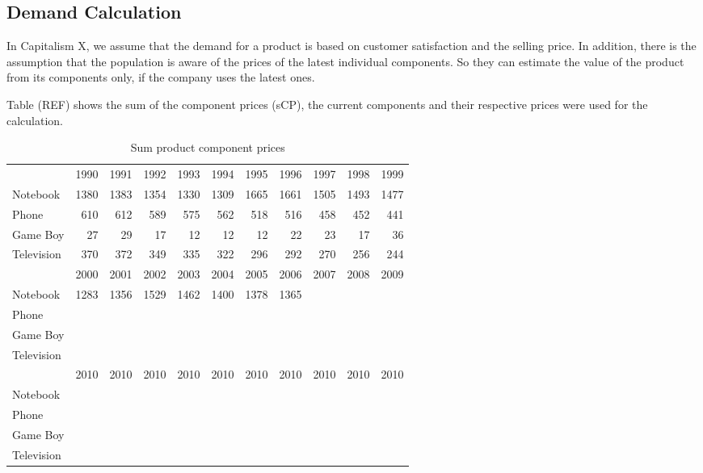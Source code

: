 \subsection{Demand Calculation}
\label{demandCalc}
In Capitalism X, we assume that the demand for a product is based on customer satisfaction and the selling price. In addition, there is the assumption that the population is aware of the prices of the latest individual components. So they can estimate the value of the product from its components only, if the company uses the latest ones.
 
Table (REF) shows the sum of the component prices (sCP), the current components and their respective prices were used for the calculation.

\begin{table}[ht]
    \centering
    \begin{tabular}{|l|r|r|r|r|r|r|r|r|r|r|}
    \hline
                & 1990  & 1991  & 1992  & 1993  & 1994  & 1995  & 1996  & 1997  & 1998  & 1999  \\
    Notebook    & 1380  & 1383  & 1354  & 1330  & 1309  & 1665  & 1661  & 1505  & 1493  & 1477  \\   
    Phone       & 610   & 612   & 589   & 575   & 562   & 518   & 516   & 458   & 452   & 441   \\ 
    Game Boy    & 27    & 29    & 17    & 12    & 12    & 12    & 22    & 23    & 17    & 36    \\  
    Television  & 370   & 372   & 349   & 335   & 322   & 296   & 292   & 270   & 256   & 244    \\ 
    \hline       
                & 2000  & 2001  & 2002  & 2003  & 2004  & 2005  & 2006  & 2007  & 2008  & 2009  \\
    Notebook    & 1283 & 1356 & 1529 & 1462 & 1400 & 1378 & 1365 &  &  &       \\   
    Phone       &  &  &  &  &  &  &  &  &  &       \\  
    Game Boy    &  &  &  &  &  &  &  &  &  &       \\   
    Television  &  &  &  &  &  &  &  &  &  &       \\ 
    \hline
                & 2010  & 2010  & 2010  & 2010  & 2010  & 2010  & 2010  & 2010  & 2010  & 2010  \\
    Notebook    &  &  &  &  &  &  &  &  &  &       \\   
    Phone       &  &  &  &  &  &  &  &  &  &       \\ 
    Game Boy    &  &  &  &  &  &  &  &  &  &       \\  
    Television  &  &  &  &  &  &  &  &  &  &       \\ 
    \hline
    \end{tabular}
    \caption{Sum product component prices}
    \label{sum_product_component_prices}
\end{table}
 
